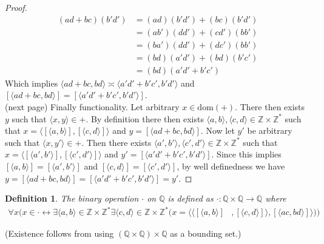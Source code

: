 \documentclass{report}
\newtheorem{definition}[theo]{Definition}
\begin{document}
\begin{proof}
\begin{align*}
(ad+bc)(b'd')&=(ad)(b'd')+(bc)(b'd')\\
&=(ab')(dd')+(cd')(bb')\\
&=(ba')(dd')+(dc')(bb')\\
&=(bd)(a'd')+(bd)(b'c')\\
&=(bd)(a'd'+b'c')
\end{align*}
Which implies $\langle ad+bc,bd\rangle\asymp\langle a'd'+b'c',b'd'\rangle$ and 
$[\langle ad+bc,bd\rangle]=[\langle a'd'+b'c',b'd'\rangle]$.\\
\noindent(next page)\newpage
Finally functionality. Let arbitrary $x\in\text{dom}(+)$. There then exists $y$ such that $\langle x,y\rangle\in+$.
By definition there then exists $\langle a,b\rangle,\langle c,d\rangle\in\mathbb Z\times\mathbb Z^*$ such that $x=\langle[\langle a,b\rangle],[\langle c,d\rangle]\rangle$ and 
$y=[\langle ad+bc,bd\rangle]$. Now let $y'$ be arbitrary such that $\langle x,y'\rangle\in+$.
Then there exists $\langle a',b'\rangle,\langle c',d'\rangle\in\mathbb Z\times\mathbb Z^*$ such that $x=\langle[\langle a',b'\rangle],[\langle c',d'\rangle]\rangle$ and 
$y'=[\langle a'd'+b'c',b'd'\rangle]$. Since this implies $[\langle a,b\rangle]=[\langle a',b'\rangle]$ and $[\langle c,d\rangle]=[\langle c',d'\rangle]$,
by well definedness we have
$y=[\langle ad+bc,bd\rangle]=[\langle a'd'+b'c',b'd'\rangle]=y'$.
\end{proof}
\begin{definition}
The binary operation $\cdot$ on $\mathbb Q$ is defined as $\cdot:\mathbb Q\times\mathbb Q\to\mathbb Q$ where
\begin{align*}
\forall x(x\in\cdot\leftrightarrow\exists\langle a,b\rangle\in\mathbb Z\times\mathbb Z^*
\exists\langle c,d\rangle\in\mathbb Z\times\mathbb Z^*(x=\langle\langle[\langle a,b\rangle]&,[\langle c,d\rangle]\rangle,
[\langle ac,bd\rangle]\rangle))
\end{align*}
\end{definition}
\noindent(Existence follows from using $(\mathbb Q\times\mathbb Q)\times\mathbb Q$ as a bounding set.)
\end{document}
